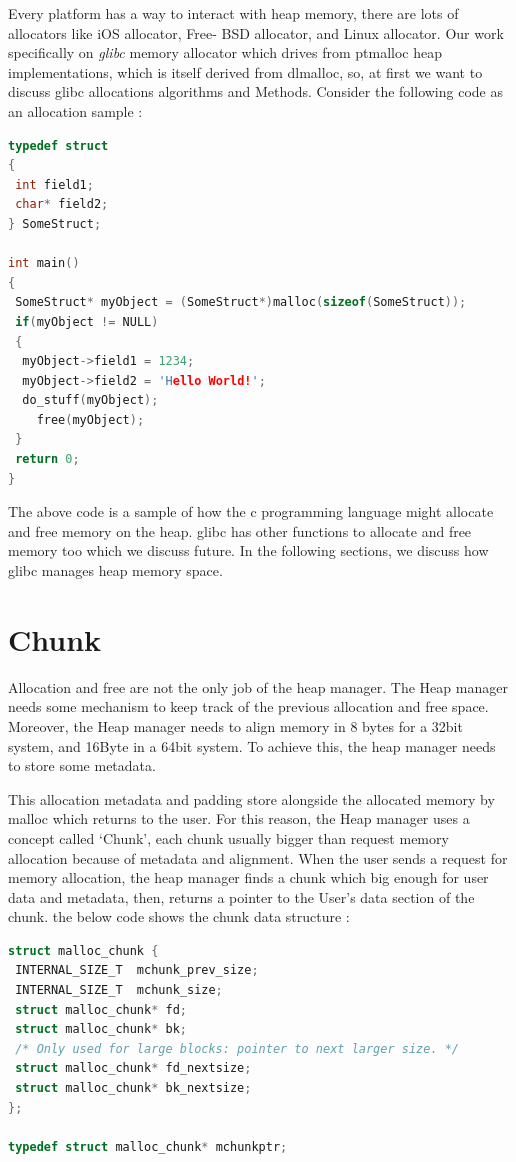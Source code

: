 \documentclass{masterthesis}
\newcommand*\libc{glibc}
\begin{document}
Every platform has a way to interact with heap memory, there are lots of allocators like iOS allocator, Free- BSD allocator, and Linux allocator. Our work specifically on \emph{ \libc{}} memory allocator which drives from ptmalloc heap implementations, which is itself derived from dlmalloc, so, at first we want to discuss \libc{} allocations algorithms and Methods. Consider the following code as an allocation sample : 

\begin{lstlisting}[language=c,frame=tlrb]
typedef struct 
{
 int field1;
 char* field2;
} SomeStruct;
 
int main()
{
 SomeStruct* myObject = (SomeStruct*)malloc(sizeof(SomeStruct));
 if(myObject != NULL)
 {
  myObject->field1 = 1234;
  myObject->field2 = 'Hello World!';
  do_stuff(myObject);
	free(myObject);
 }
 return 0;
}

\end{lstlisting}

The above code is a sample of how the c programming language might allocate and free memory on the heap. \libc{} has other functions to allocate and free memory too which we discuss future. In the following sections, we discuss how \libc{} manages heap memory space. 

\section{Chunk}

Allocation and free are not the only job of the heap manager. The Heap manager needs some mechanism to keep track of the previous allocation and free space. Moreover, the Heap manager needs to align memory in 8 bytes for a 32bit system, and 16Byte in a 64bit system. To achieve this, the heap manager needs to store some metadata.

This allocation metadata and padding store alongside the allocated memory by malloc which returns to the user. For this reason, the Heap manager uses a concept called ‘Chunk’, each chunk usually bigger than request memory allocation because of metadata and alignment. When the user sends a request for memory allocation, the heap manager finds a chunk which big enough for user data and metadata, then, returns a pointer to the User's data section of the chunk. the below code shows the chunk data structure :

\begin{lstlisting}[language=c,frame=tlrb]
struct malloc_chunk {
 INTERNAL_SIZE_T  mchunk_prev_size; 
 INTERNAL_SIZE_T  mchunk_size;
 struct malloc_chunk* fd; 
 struct malloc_chunk* bk;
 /* Only used for large blocks: pointer to next larger size. */
 struct malloc_chunk* fd_nextsize;
 struct malloc_chunk* bk_nextsize;
};

typedef struct malloc_chunk* mchunkptr;
\end{lstlisting}
\end{document}
